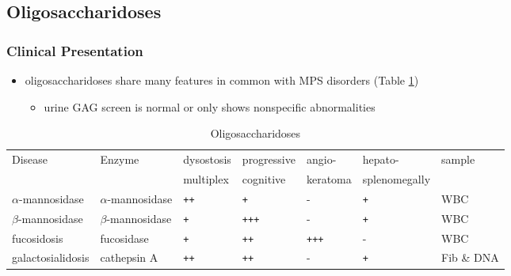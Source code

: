 \documentclass[12pt]{scrartcl}
\begin{document}
\subsection{Oligosaccharidoses}
\label{sec:org1c26235}
\subsubsection{Clinical Presentation}
\label{sec:orgb53f4f0}
\begin{itemize}
\item oligosaccharidoses share many features in common with MPS disorders (Table \ref{tab:org80e825d})
\begin{itemize}
\item urine GAG screen is normal or only shows nonspecific
abnormalities
\end{itemize}
\end{itemize}

\begin{table}[htbp]
\caption{\label{tab:org80e825d}Oligosaccharidoses}
\centering
\begin{tabular}{lllllll}
Disease & Enzyme & dysostosis & progressive & angio- & hepato- & sample\\
 &  & multiplex & cognitive & keratoma & splenomegally & \\
\hline
\(\alpha\)-mannosidase & \(\alpha\)-mannosidase & \texttt{++} & \texttt{+} & - & \texttt{+} & WBC\\
\(\beta\)-mannosidase & \(\beta\)-mannosidase & \texttt{+} & \texttt{+++} & - & \texttt{+} & WBC\\
fucosidosis & fucosidase & \texttt{+} & \texttt{++} & \texttt{+++} & - & WBC\\
galactosialidosis & cathepsin A & \texttt{++} & \texttt{++} & - & \texttt{+} & Fib \& DNA\\
\end{tabular}
\end{table}
\end{document}
